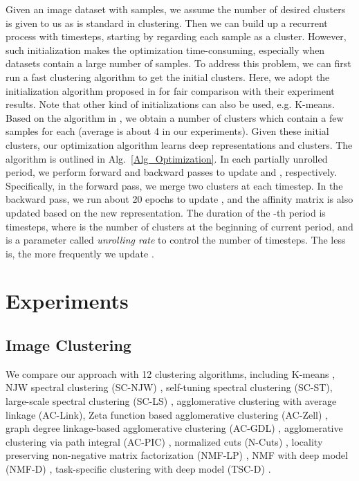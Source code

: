 \documentclass[10pt,twocolumn,letterpaper]{article}
\begin{document}
{{Given an image dataset with  samples, we assume the number of desired clusters  is given to us {as is standard in clustering}. Then we can build up a recurrent process with   timesteps, starting by regarding each sample as a cluster}. However, such initialization makes the optimization time-consuming, especially when datasets contain a large number of samples. To address this problem, we can first run a fast clustering algorithm to get the initial clusters. Here, we adopt the initialization algorithm proposed in \cite{zhang2013agglomerative} for fair comparison with their experiment results. Note that other kind of initializations {can also be used}, e.g. K-means. {Based on the algorithm in \cite{zhang2013agglomerative}}, we obtain a number of clusters which contain a few samples for each (average is about 4 in our experiments). {Given these initial clusters, our optimization algorithm learns deep representations and clusters}. The algorithm is outlined in Alg.~\ref{Alg_Optimization}. In each {partially unrolled period}, we perform forward and backward passes to update  and , respectively. Specifically, in the forward pass, we merge two clusters at each timestep. {In the backward pass}, we run about 20 epochs to update , {and the affinity matrix  is also updated based on the new representation}. The duration of the -th period is  timesteps, where  is the number of clusters at the beginning of current period, and  is a parameter called \emph{unrolling rate} to control the number of timesteps. The less  is, the more frequently we update .}

\section{Experiments}
\vspace{-5pt}
\subsection{Image Clustering}
We compare our approach with 12 clustering algorithms, including K-means \cite{macqueen1967some}, NJW spectral clustering (SC-NJW) \cite{ng2002spectral}, self-tuning spectral clustering (SC-ST)\cite{zelnik2004self}, large-scale spectral clustering (SC-LS) \cite{chen2011large}, agglomerative clustering with average linkage (AC-Link)\cite{jain1999data}, Zeta function based agglomerative clustering (AC-Zell) \cite{zhao2009cyclizing}, graph degree linkage-based agglomerative clustering (AC-GDL) \cite{zhang2012graph}, agglomerative clustering via path integral (AC-PIC) \cite{zhang2013agglomerative}, normalized cuts (N-Cuts) \cite{shi2000normalized}, locality preserving non-negative matrix factorization (NMF-LP) \cite{cai2009locality}, NMF with deep model (NMF-D) \cite{trigeorgis2014deep}, task-specific clustering with deep model (TSC-D) \cite{wang2015learning}.
\end{document}
